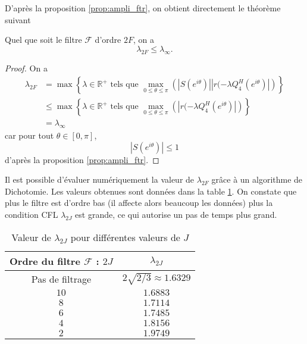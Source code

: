 D'après la proposition \ref{prop:ampli_ftr}, on obtient directement le théorème suivant
\begin{theoreme}
Quel que soit le filtre $\mathcal{F}$ d'ordre $2F$, on a 
\begin{equation}
\lambda_{2F} \leq \lambda_{\infty}.
\end{equation}
\end{theoreme}

\begin{proof}
On a 
\begin{align*}
\lambda_{2F} & = \max \left\lbrace \lambda \in \mathbb{R}^+ \text{ tels que } \max_{0 \leq \theta \leq \pi} \left(|S(e^{i \theta})| | r(-\lambda Q_4^H(e^{i \theta}) | \right) \right\rbrace \\
		& \leq \max \left\lbrace \lambda \in \mathbb{R}^+ \text{ tels que } \max_{0 \leq \theta \leq \pi} \left(| r(-\lambda Q_4^H(e^{i \theta}) | \right) \right\rbrace\\
		& = \lambda_{\infty}
\end{align*}
car pour tout $\theta \in [0, \pi]$, 
\begin{equation}
|S(e^{i \theta})| \leq 1
\end{equation}
d'après la proposition \ref{prop:ampli_ftr}.
\end{proof}

Il est possible d'évaluer numériquement la valeur de $\lambda_{2F}$ grâce à un algorithme de Dichotomie. Les valeurs obtenues sont données dans la table \ref{tab:cfl_adv1d}. On constate que plus le filtre est d'ordre bas (il affecte alors beaucoup les données) plus la condition CFL $\lambda_{2J}$ est grande, ce qui autorise un pas de temps plus grand.

\begin{table}[htbp]
\begin{center}
\begin{tabular}{|c|c|}
\hline
\textbf{Ordre du filtre} $\mathcal{F}$ : $2J$ & $\lambda_{2J}$ \\
\hline
\hline
Pas de filtrage & $2 \sqrt{2/3} \approx 1.6329$ \\
$10$ & $1.6883$ \\
$ 8$ & $1.7114$ \\
$ 6$ & $1.7485$ \\
$ 4$ & $1.8156$ \\
$ 2$ & $1.9749$ \\
\hline
\end{tabular}
\end{center}
\caption{Valeur de $\lambda_{2J}$ pour différentes valeurs de $J$}
\label{tab:cfl_adv1d}
\end{table}













